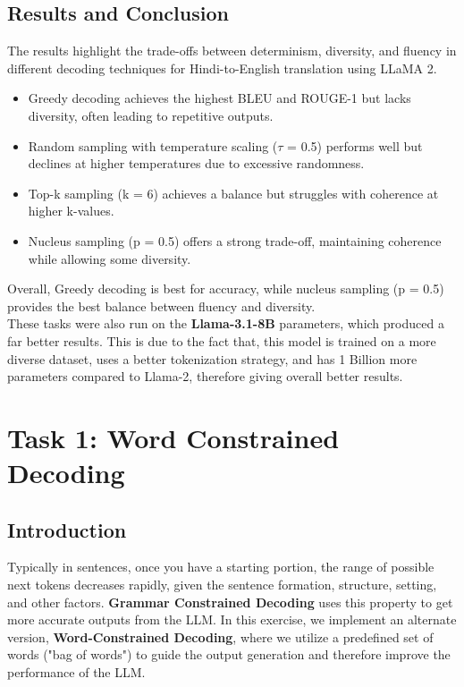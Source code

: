 \documentclass{article}
\begin{document}
\subsection{Results and Conclusion}
The results highlight the trade-offs between determinism, diversity, and fluency in different decoding techniques for Hindi-to-English translation using LLaMA 2. \begin{itemize}
    \item Greedy decoding achieves the highest BLEU and ROUGE-1 but lacks diversity, often leading to repetitive outputs.
    \item Random sampling with temperature scaling ($\tau$ = 0.5) performs well but declines at higher temperatures due to excessive randomness.
    \item Top-k sampling (k = 6) achieves a balance but struggles with coherence at higher k-values.
    \item Nucleus sampling (p = 0.5) offers a strong trade-off, maintaining coherence while allowing some diversity.
\end{itemize} 
Overall, Greedy decoding is best for accuracy, while nucleus sampling (p = 0.5) provides the best balance between fluency and diversity.\\
These tasks were also run on the \textbf{Llama-3.1-8B} parameters, which produced a far better results. This is due to the fact that, this model is trained on a more diverse dataset, uses a better tokenization strategy, and has 1 Billion more parameters compared to Llama-2, therefore giving overall better results.\\

\section{Task 1: Word Constrained Decoding}
\subsection{Introduction}
Typically in sentences, once you have a starting portion, the range of possible next tokens decreases rapidly, given the sentence formation, structure, setting, and other factors. \textbf{Grammar Constrained Decoding} uses this property to get more accurate outputs from the LLM. In this exercise, we implement an alternate version, \textbf{Word-Constrained Decoding}, where we utilize a predefined set of words ("bag of words") to guide the output generation and therefore improve the performance of the LLM.
\end{document}
